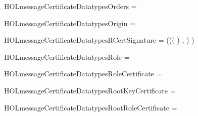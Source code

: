 \newcommand{\HOLmessageCertificateDatatypesMessage}{\UseVerbatim{HOLmessageCertificateDatatypesMessage}}
\begin{SaveVerbatim}{HOLmessageCertificateDatatypesOrders}
 =     
\end{SaveVerbatim}
\newcommand{\HOLmessageCertificateDatatypesOrders}{\UseVerbatim{HOLmessageCertificateDatatypesOrders}}
\begin{SaveVerbatim}{HOLmessageCertificateDatatypesOrigin}
 =  
\end{SaveVerbatim}
\newcommand{\HOLmessageCertificateDatatypesOrigin}{\UseVerbatim{HOLmessageCertificateDatatypesOrigin}}
\begin{SaveVerbatim}{HOLmessageCertificateDatatypesRCertSignature}
 =
     ((( \HOLTokenProd{}
                \HOLTokenProd{}
                \HOLTokenProd{}  \HOLTokenProd{} ) ,
              ) )
\end{SaveVerbatim}
\newcommand{\HOLmessageCertificateDatatypesRCertSignature}{\UseVerbatim{HOLmessageCertificateDatatypesRCertSignature}}
\begin{SaveVerbatim}{HOLmessageCertificateDatatypesRole}
 =  
\end{SaveVerbatim}
\newcommand{\HOLmessageCertificateDatatypesRole}{\UseVerbatim{HOLmessageCertificateDatatypesRole}}
\begin{SaveVerbatim}{HOLmessageCertificateDatatypesRoleCertificate}
 =
          
\end{SaveVerbatim}
\newcommand{\HOLmessageCertificateDatatypesRoleCertificate}{\UseVerbatim{HOLmessageCertificateDatatypesRoleCertificate}}
\begin{SaveVerbatim}{HOLmessageCertificateDatatypesRootKeyCertificate}
 =   
\end{SaveVerbatim}
\newcommand{\HOLmessageCertificateDatatypesRootKeyCertificate}{\UseVerbatim{HOLmessageCertificateDatatypesRootKeyCertificate}}
\begin{SaveVerbatim}{HOLmessageCertificateDatatypesRootRoleCertificate}
 =    
\end{SaveVerbatim}
